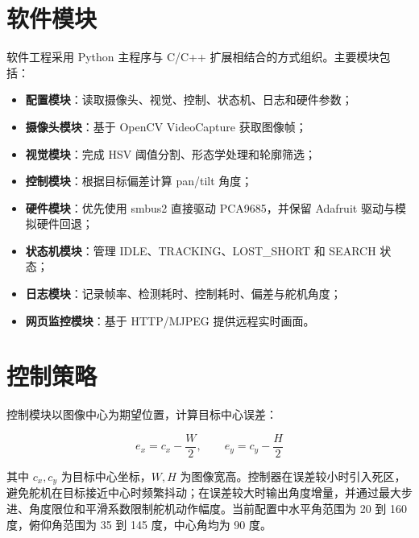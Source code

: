 \section{软件模块}

软件工程采用 Python 主程序与 C/C++ 扩展相结合的方式组织。主要模块包括：

\begin{itemize}
  \item \textbf{配置模块}：读取摄像头、视觉、控制、状态机、日志和硬件参数；
  \item \textbf{摄像头模块}：基于 OpenCV VideoCapture 获取图像帧；
  \item \textbf{视觉模块}：完成 HSV 阈值分割、形态学处理和轮廓筛选；
  \item \textbf{控制模块}：根据目标偏差计算 pan/tilt 角度；
  \item \textbf{硬件模块}：优先使用 smbus2 直接驱动 PCA9685，并保留 Adafruit 驱动与模拟硬件回退；
  \item \textbf{状态机模块}：管理 IDLE、TRACKING、LOST\_SHORT 和 SEARCH 状态；
  \item \textbf{日志模块}：记录帧率、检测耗时、控制耗时、偏差与舵机角度；
  \item \textbf{网页监控模块}：基于 HTTP/MJPEG 提供远程实时画面。
\end{itemize}

\section{控制策略}

控制模块以图像中心为期望位置，计算目标中心误差：

\begin{equation}
  e_x = c_x - \frac{W}{2}, \qquad e_y = c_y - \frac{H}{2}
\end{equation}

其中 $c_x,c_y$ 为目标中心坐标，$W,H$ 为图像宽高。控制器在误差较小时引入死区，避免舵机在目标接近中心时频繁抖动；在误差较大时输出角度增量，并通过最大步进、角度限位和平滑系数限制舵机动作幅度。当前配置中水平角范围为 20 到 160 度，俯仰角范围为 35 到 145 度，中心角均为 90 度。

